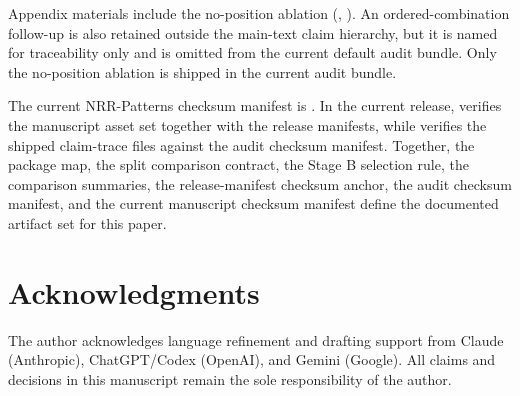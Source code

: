 \documentclass[11pt,a4paper]{article}
\begin{document}
Appendix materials include the no-position ablation
(, ).
An ordered-combination follow-up is also retained outside the main-text claim
hierarchy, but it is named for traceability only and is omitted from the
current default audit bundle. Only the no-position ablation is shipped in the
current audit bundle.

The current NRR-Patterns checksum manifest is
. In the current
release,  verifies the manuscript asset
set together with the release manifests, while
 verifies the shipped claim-trace files
against the audit checksum manifest. Together, the package map, the split
comparison contract, the Stage B selection rule, the comparison summaries, the
release-manifest checksum anchor, the audit checksum manifest, and the current
manuscript checksum manifest define the documented artifact set for this paper.

\section*{Acknowledgments}
The author acknowledges language refinement and drafting support from Claude
(Anthropic), ChatGPT/Codex (OpenAI), and Gemini (Google). All claims and
decisions in this manuscript remain the sole responsibility of the author.
\end{document}
